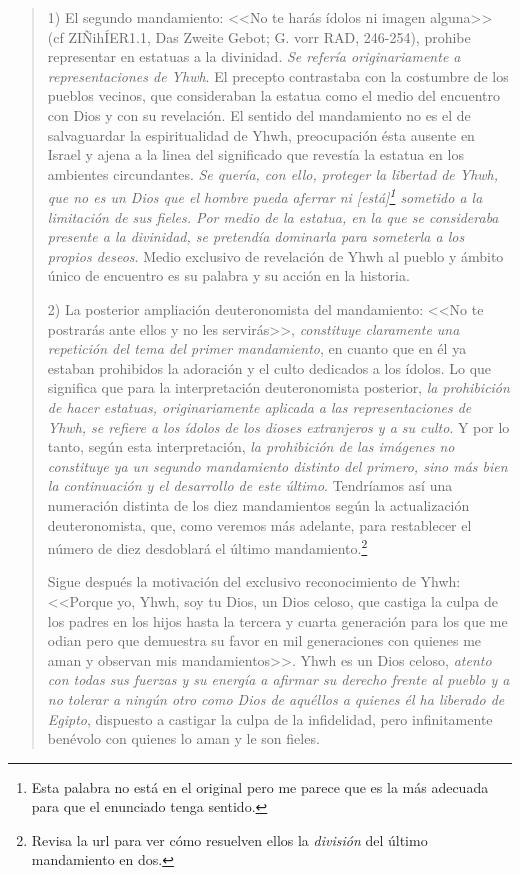 \begin{quote}
1) El segundo mandamiento: <<No te harás ídolos ni imagen alguna>> (cf ZIÑihÍER1.1, Das Zweite Gebot; G. vorr RAD, 246-254), prohibe representar en estatuas a la divinidad. \emph{Se refería originariamente a representaciones de Yhwh}. El precepto contrastaba con la costumbre de los pueblos vecinos, que consideraban la estatua como el medio del encuentro con Dios y con su revelación. El sentido del mandamiento no es el de salvaguardar la espiritualidad de Yhwh, preocupación ésta ausente en Israel y ajena a la linea del significado que revestía la estatua en los ambientes circundantes. \emph{Se quería, con ello, proteger la libertad de Yhwh, que no es un Dios que el hombre pueda aferrar ni [est\'a]\footnote{Esta palabra no est\'a en el original pero me parece que es la m\'as adecuada para que el enunciado tenga sentido.} sometido a la limitación de sus fieles. Por medio de la estatua, en la que se consideraba presente a la divinidad, se pretendía dominarla para someterla a los propios deseos}. Medio exclusivo de revelación de Yhwh al pueblo y ámbito único de encuentro es su palabra y su acción en la historia.

2) La posterior ampliación deuteronomista del mandamiento: <<No te postrarás ante ellos y no les servirás>>, \emph{constituye claramente una repetición del tema del primer mandamiento}, en cuanto que en él ya estaban prohibidos la adoración y el culto dedicados a los ídolos. Lo que significa que para la interpretación deuteronomista posterior, \emph{la prohibición de hacer estatuas, originariamente aplicada a las representaciones de Yhwh, se refiere a los ídolos de los dioses extranjeros y a su culto}. Y por lo tanto, según esta interpretación, \emph{la prohibición de las imágenes no constituye ya un segundo mandamiento distinto del primero, sino más bien la continuación y el desarrollo de este último}. Tendríamos así una numeración distinta de los diez mandamientos según la actualización deuteronomista, que, como veremos más adelante, para restablecer el número de diez desdoblará el último mandamiento.\footnote{Revisa la url para ver c\'omo resuelven ellos la \emph{divisi\'on} del \'ultimo mandamiento en dos.}

Sigue después la motivación del exclusivo reconocimiento de Yhwh: <<Porque yo, Yhwh, soy tu Dios, un Dios celoso, que castiga la culpa de los padres en los hijos hasta la tercera y cuarta generación para los que me odian pero que demuestra su favor en mil generaciones con quienes me aman y observan mis mandamientos>>. Yhwh es un Dios celoso, \emph{atento con todas sus fuerzas y su energía a afirmar su derecho frente al pueblo y a no tolerar a ningún otro como Dios de aquéllos a quienes él ha liberado de Egipto}, dispuesto a castigar la culpa de la infidelidad, pero infinitamente benévolo con quienes lo aman y le son fieles.
\end{quote}

